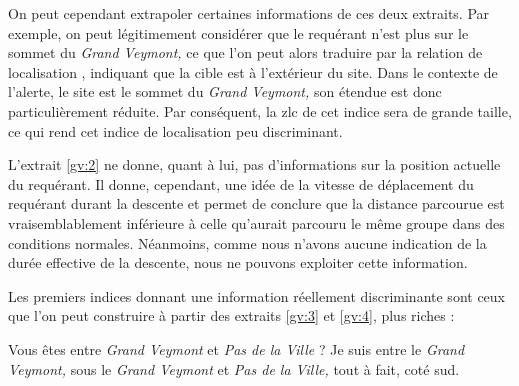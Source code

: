 On peut cependant extrapoler certaines informations de ces deux
extraits. Par exemple, on peut légitimement considérer que le
requérant n'est plus sur le sommet du \emph{Grand Veymont,} ce que
l'on peut alors traduire par la relation de localisation
, indiquant que la cible est à
l'extérieur du site. Dans le contexte de l'alerte, le site est le
sommet du \emph{Grand Veymont,} son étendue est donc particulièrement
réduite. Par conséquent, la \ac{zlc} de cet indice sera de grande
taille, ce qui rend cet indice de localisation peu discriminant.

L'extrait \ref{gv:2} ne donne, quant à lui, pas d'informations sur la
position actuelle du requérant. Il donne, cependant, une idée de la
vitesse de déplacement du requérant durant la descente et permet de
conclure que la distance parcourue est vraisemblablement inférieure à
celle qu'aurait parcouru le même groupe dans des conditions
normales. Néanmoins, comme nous n'avons aucune indication de la durée
effective de la descente, nous ne pouvons exploiter cette information.

Les premiers indices donnant une information réellement discriminante
sont ceux que l'on peut construire à partir des extraits \ref{gv:3} et
\ref{gv:4}, plus riches :
%
\begin{dialogue*}
  \Sec {} Vous êtes entre \emph{Grand Veymont} et
  \emph{Pas de la Ville} ?
  \Req {} Je suis entre le \emph{Grand Veymont,}
   sous le \emph{Grand Veymont} et \emph{Pas de la
    Ville,} tout à fait,  coté sud.
\end{dialogue*}

